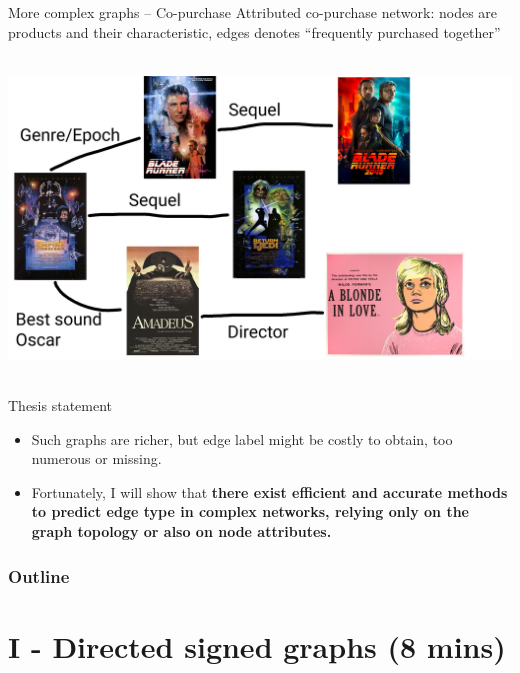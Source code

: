 \documentclass[10pt,svgnames,ignorenonframetext,final]{beamer}
\begin{document}
\begin{frame}{More complex graphs -- Co-purchase}
  Attributed co-purchase network: nodes are products and their
  characteristic, edges denotes “frequently purchased together”

  \begin{center}
  \includegraphics[height=8.5cm]{movies2.png}
  \end{center}
\end{frame}

\begin{frame}{Thesis statement}
\protect\hypertarget{thesis-statement}{}

\begin{itemize}
\item
  Such graphs are richer, but edge label might be costly to obtain,
  too numerous or missing.
\item
  Fortunately, I will show that \textbf{there exist \alert{efficient and accurate} methods to
  \alert{predict edge type} in \alert{complex networks}, relying only on the \alert{graph topology}
or also on \alert{node attributes}.}
\end{itemize}

\end{frame}

  \begin{frame}
    \frametitle{Outline}
    \tableofcontents%
  \end{frame}

\section{I - Directed signed graphs (8 mins)}
\label{i---directed-signed-graphs-8-minutes}
\end{document}
